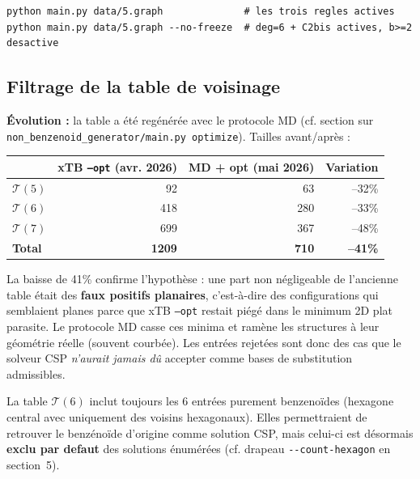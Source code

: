\begin{lstlisting}[style=benzai]
python main.py data/5.graph              # les trois regles actives
python main.py data/5.graph --no-freeze  # deg=6 + C2bis actives, b>=2 desactive
\end{lstlisting}

\subsection{Filtrage de la table de voisinage}


\textbf{Évolution :} la table a été regénérée avec le protocole MD (cf. section sur
\texttt{non\_benzenoid\_generator/main.py optimize}). Tailles avant/après :

\begin{center}
\begin{tabular}{lrrr}
  \toprule
                & xTB \texttt{--opt} (avr. 2026) & MD + opt (mai 2026) & Variation \\
  \midrule
  $\mathcal{T}(5)$ &  92 &  63 & --32\% \\
  $\mathcal{T}(6)$ & 418 & 280 & --33\% \\
  $\mathcal{T}(7)$ & 699 & 367 & --48\% \\
  \midrule
  \textbf{Total}  & \textbf{1209} & \textbf{710} & \textbf{--41\%} \\
  \bottomrule
\end{tabular}
\end{center}

La baisse de 41\% confirme l'hypothèse : une part non négligeable de l'ancienne table
était des \textbf{faux positifs planaires}, c'est-à-dire des configurations qui semblaient
planes parce que xTB \texttt{--opt} restait piégé dans le minimum 2D plat parasite. Le
protocole MD casse ces minima et ramène les structures à leur géométrie réelle (souvent
courbée). Les entrées rejetées sont donc des cas que le solveur CSP \emph{n'aurait jamais
dû} accepter comme bases de substitution admissibles.

\begin{remarque}
  La table $\mathcal{T}(6)$ inclut toujours les 6 entrées purement benzenoïdes (hexagone
  central avec uniquement des voisins hexagonaux). Elles permettraient de retrouver le
  benzénoïde d'origine comme solution CSP, mais celui-ci est désormais \textbf{exclu par
  defaut} des solutions énumérées (cf. drapeau \texttt{-{}-count-hexagon} en section~5).
\end{remarque}

